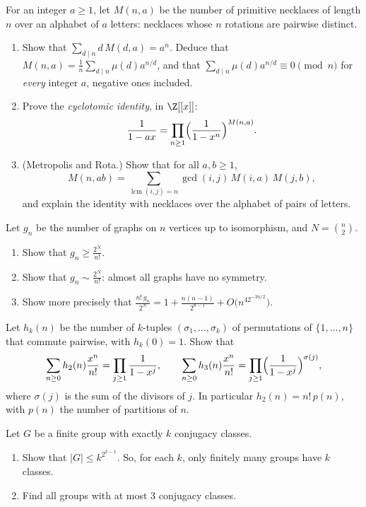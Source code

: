 \begin{exercise}[$\star\star$]\label{pb:necklacering}
For an integer $a\ge1$, let $M(n,a)$ be the number of primitive necklaces of length $n$ over an alphabet of $a$ letters:
necklaces whose $n$ rotations are pairwise distinct.
\begin{enumerate}[label=(\alph*)]
\item Show that $\sum_{d\mid n}d\,M(d,a)=a^n$. Deduce that $M(n,a)=\frac1n\sum_{d\mid n}\mu(d)a^{n/d}$, and that
$\sum_{d\mid n}\mu(d)a^{n/d}\equiv0\pmod n$ for \emph{every} integer $a$, negative ones included.
\item Prove the \emph{cyclotomic identity}, in $\Z[[x]]$:
\[
\frac1{1-ax}=\prod_{n\ge1}\Bigl(\frac1{1-x^n}\Bigr)^{M(n,a)}.
\]
\item (Metropolis and Rota.) Show that for all $a,b\ge1$,
\[
M(n,ab)=\sum_{\operatorname{lcm}(i,j)=n}\gcd(i,j)\,M(i,a)\,M(j,b),
\]
and explain the identity with necklaces over the alphabet of pairs of letters.
\end{enumerate}
\end{exercise}

\begin{exercise}[$\star\star\star$]\label{pb:unlabelled}
Let $g_n$ be the number of graphs on $n$ vertices up to isomorphism, and $N=\binom n2$.
\begin{enumerate}[label=(\alph*)]
\item Show that $g_n\ge\frac{2^N}{n!}$.
\item Show that $g_n\sim\frac{2^N}{n!}$: almost all graphs have no symmetry.
\item Show more precisely that $\frac{n!\,g_n}{2^N}=1+\frac{n(n-1)}{2^{n-1}}+O\bigl(n^42^{-3n/2}\bigr)$.
\end{enumerate}
\end{exercise}

\begin{exercise}[$\star\star\star$]\label{pb:commuting}
Let $h_k(n)$ be the number of $k$-tuples $(\sigma_1,\dots,\sigma_k)$ of permutations of $\{1,\dots,n\}$ that commute pairwise,
with $h_k(0)=1$. Show that
\[
\sum_{n\ge0}h_2(n)\frac{x^n}{n!}=\prod_{j\ge1}\frac1{1-x^j},\qquad\sum_{n\ge0}h_3(n)\frac{x^n}{n!}=\prod_{j\ge1}\Bigl(\frac1{1-x^j}\Bigr)^{\sigma(j)},
\]
where $\sigma(j)$ is the sum of the divisors of $j$. In particular $h_2(n)=n!\,p(n)$, with $p(n)$ the number of partitions of $n$.
\end{exercise}

\begin{exercise}[$\star\star$]\label{pb:landau}
Let $G$ be a finite group with exactly $k$ conjugacy classes.
\begin{enumerate}[label=(\alph*)]
\item Show that $|G|\le k^{2^{k-1}}$. So, for each $k$, only finitely many groups have $k$ classes.
\item Find all groups with at most $3$ conjugacy classes.
\end{enumerate}
\end{exercise}


